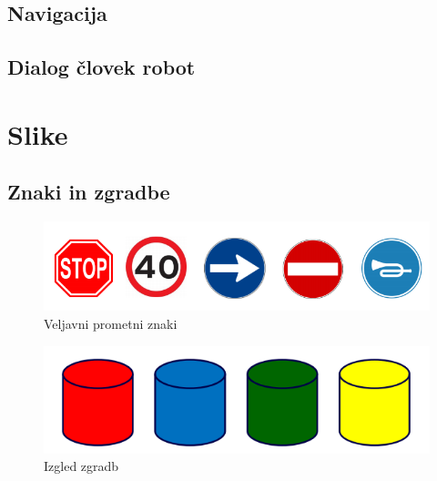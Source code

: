 \documentclass[a4paper,11pt]{article}
\begin{document}
\subsection{Navigacija}

\subsection{Dialog človek robot}
\appendix
\appendixpage
\section{\label{sec:slike} Slike}
\subsection{Znaki in zgradbe}
\begin{figure}[htbp]
\begin{center}
\includegraphics[width=\textwidth, scale=0.8]{signs.png}
\caption{Veljavni prometni znaki}
\label{slika1}
\end{center}
\end{figure}

\begin{figure}[htbp]
\begin{center}
\includegraphics[width=\textwidth]{buildings.png}
\caption{Izgled zgradb}
\label{slika1}
\end{center}
\end{figure}


\pagebreak
\end{document}
